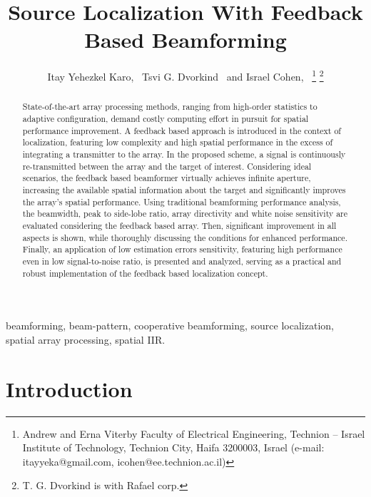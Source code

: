 \documentclass[journal]{IEEEtran}
\begin{document}
\title{Source Localization With Feedback Based Beamforming}
\author{Itay Yehezkel Karo,~\IEEEmembership{}
        Tsvi G. Dvorkind~\IEEEmembership{}
        and 
        Israel Cohen,~
\thanks{Andrew and Erna Viterby Faculty of Electrical Engineering, Technion -- Israel Institute of Technology, Technion City, Haifa 3200003, Israel (e-mail: itayyeka@gmail.com, icohen@ee.technion.ac.il)}%
\thanks{T. G. Dvorkind is with Rafael corp.}%
}
\markboth{}%
{}
\maketitle
\begin{abstract}
State-of-the-art array processing methods, ranging from high-order statistics to adaptive configuration, demand costly computing effort in pursuit for spatial performance improvement.
A feedback based approach is introduced in the context of localization, featuring low complexity and high spatial performance in the excess of integrating a transmitter to the array.  
In the proposed scheme, a signal is continuously re-transmitted between the array and the target of interest.
Considering ideal scenarios, the feedback based beamformer virtually achieves infinite aperture, increasing the available spatial information about the target and significantly improves the array's spatial performance.
Using traditional beamforming performance analysis, the beamwidth, peak to side-lobe ratio, array directivity and white noise sensitivity are evaluated considering the feedback based array.
Then, significant improvement in all aspects is shown, while thoroughly discussing the conditions for enhanced performance.
Finally, an application of low estimation errors sensitivity, featuring high performance even in low signal-to-noise ratio, is presented and analyzed, serving as a practical and robust implementation of the feedback based localization concept. 
\end{abstract}
\begin{IEEEkeywords}
beamforming, beam-pattern, cooperative beamforming, source localization, spatial array processing, spatial IIR.
\end{IEEEkeywords}
\section{Introduction}

\end{document}
